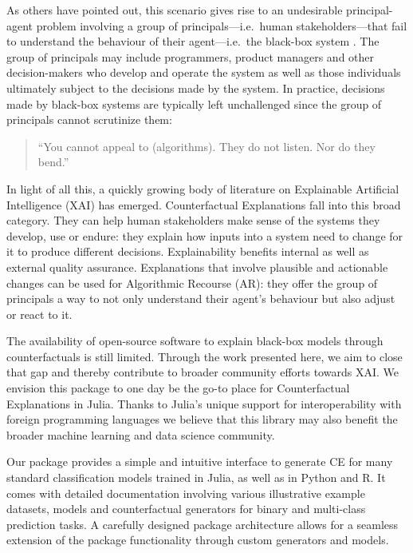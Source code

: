 \documentclass{juliacon}
\begin{document}
As others have pointed out, this scenario gives rise to an undesirable
principal-agent problem involving a group of principals---i.e.~human
stakeholders---that fail to understand the behaviour of their
agent---i.e.~the black-box system \autocite{borch2022machine}. The group
of principals may include programmers, product managers and other
decision-makers who develop and operate the system as well as those
individuals ultimately subject to the decisions made by the system. In
practice, decisions made by black-box systems are typically left
unchallenged since the group of principals cannot scrutinize them:

\begin{quote}
``You cannot appeal to (algorithms). They do not listen. Nor do they
bend.'' \autocite{oneil2016weapons}
\end{quote}

In light of all this, a quickly growing body of literature on
Explainable Artificial Intelligence (XAI) has emerged. Counterfactual
Explanations fall into this broad category. They can help human
stakeholders make sense of the systems they develop, use or endure: they
explain how inputs into a system need to change for it to produce
different decisions. Explainability benefits internal as well as
external quality assurance. Explanations that involve plausible and
actionable changes can be used for Algorithmic Recourse (AR): they offer
the group of principals a way to not only understand their agent's
behaviour but also adjust or react to it.

The availability of open-source software to explain black-box models
through counterfactuals is still limited. Through the work presented
here, we aim to close that gap and thereby contribute to broader
community efforts towards XAI. We envision this package to one day be
the go-to place for Counterfactual Explanations in Julia. Thanks to
Julia's unique support for interoperability with foreign programming
languages we believe that this library may also benefit the broader
machine learning and data science community.

Our package provides a simple and intuitive interface to generate CE for
many standard classification models trained in Julia, as well as in
Python and R. It comes with detailed documentation involving various
illustrative example datasets, models and counterfactual generators for
binary and multi-class prediction tasks. A carefully designed package
architecture allows for a seamless extension of the package
functionality through custom generators and models.
\end{document}
